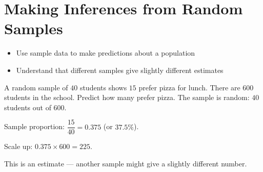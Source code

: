\section{Making Inferences from Random Samples}

\begin{stepGoal}
\begin{itemize}
    \item Use sample data to make predictions about a population
    \item Understand that different samples give slightly different estimates
\end{itemize}
\end{stepGoal}

\begin{stepVocabBox}
\end{stepVocabBox}

\begin{stepsCard}
\end{stepsCard}

\begin{stepExample}{A random sample of $40$ students shows $15$ prefer pizza for lunch. There are $600$ students in the school. Predict how many prefer pizza.}
     The sample is random: $40$ students out of $600$.

     Sample proportion: $\dfrac{15}{40} = 0.375$ (or $37.5\%$).

     Scale up: $0.375 \times 600 = 225$.

     This is an estimate — another sample might give a slightly different number.
\end{stepExample}


